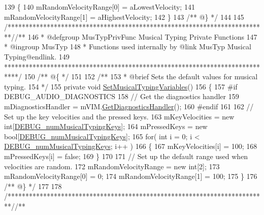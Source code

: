 \begin{DoxyCodeInclude}
139     \{
140         mRandomVelocityRange[0] = aLowestVelocity;
141         mRandomVelocityRange[1] = aHighestVelocity;
142     \}\textcolor{comment}{}
143 \textcolor{comment}{    /** @\} */}
144 
145     \textcolor{comment}{/*************************************************************************/}\textcolor{comment}{/** }
146 \textcolor{comment}{    * @defgroup MusTypPrivFunc Musical Typing Private Functions}
147 \textcolor{comment}{    * @ingroup MusTyp}
148 \textcolor{comment}{    * Functions used internally by @link MusTyp Musical Typing@endlink.}
149 \textcolor{comment}{    ****************************************************************************/}\textcolor{comment}{}
150 \textcolor{comment}{    /** @\{ */}
151 \textcolor{comment}{}
152 \textcolor{comment}{    /** }
153 \textcolor{comment}{     * @brief Sets the default values for musical typing.}
154 \textcolor{comment}{    */}
155     \textcolor{keyword}{private} \textcolor{keywordtype}{void} \hyperlink{group___mus_typ_priv_func_ga5db8ab750574dbc31279827ea5cc501e}{SetMusicalTypingVariables}()
156     \{
157 \textcolor{preprocessor}{        #if DEBUG\_AUDIO\_DIAGNOSTICS}
158             \textcolor{comment}{// Get the diagnostics handler}
159             mDiagnosticsHandler = mVIM.\hyperlink{group___v_i_m_pub_func_ga7e60bc3c5464d8f34f0d56def675bcc6}{GetDiagnosticsHandler}();
160 \textcolor{preprocessor}{        #endif}
161 
162         \textcolor{comment}{// Set up the key velocities and the pressed keys.}
163         mKeyVelocities = \textcolor{keyword}{new} \textcolor{keywordtype}{int}[\hyperlink{group___mus_typ_const_ga1a5182f5dda1cd3a5b400911a3f4cb69}{DEBUG\_numMusicalTypingKeys}];
164         mPressedKeys = \textcolor{keyword}{new} \textcolor{keywordtype}{bool}[\hyperlink{group___mus_typ_const_ga1a5182f5dda1cd3a5b400911a3f4cb69}{DEBUG\_numMusicalTypingKeys}];
165         \textcolor{keywordflow}{for}( \textcolor{keywordtype}{int} i = 0; i < \hyperlink{group___mus_typ_const_ga1a5182f5dda1cd3a5b400911a3f4cb69}{DEBUG\_numMusicalTypingKeys}; i++ )
166         \{
167             mKeyVelocities[i] = 100;
168             mPressedKeys[i] = \textcolor{keyword}{false};
169         \}
170 
171         \textcolor{comment}{// Set up the default range used when velocities are random.}
172         mRandomVelocityRange = \textcolor{keyword}{new} \textcolor{keywordtype}{int}[2];
173         mRandomVelocityRange[0] = 0;
174         mRandomVelocityRange[1] = 100;
175     \}\textcolor{comment}{}
176 \textcolor{comment}{    /** @\} */}
177 
178     \textcolor{comment}{/*************************************************************************/}\textcolor{comment}{/** }

\end{DoxyCodeInclude}
